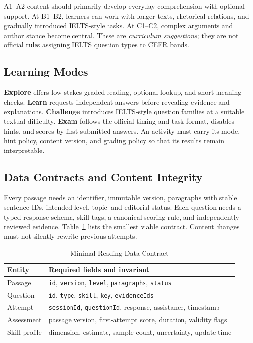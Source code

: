 \documentclass[conference,10pt]{IEEEtran}
\begin{document}
A1--A2 content should primarily develop everyday comprehension with optional support. At B1--B2, learners can work with longer texts, rhetorical relations, and gradually introduced IELTS-style tasks. At C1--C2, complex arguments and author stance become central. These are \emph{curriculum suggestions}; they are not official rules assigning IELTS question types to CEFR bands.

\subsection{Learning Modes}
\textbf{Explore} offers low-stakes graded reading, optional lookup, and short meaning checks. \textbf{Learn} requests independent answers before revealing evidence and explanations. \textbf{Challenge} introduces IELTS-style question families at a suitable textual difficulty. \textbf{Exam} follows the official timing and task format, disables hints, and scores by first submitted answers. An activity must carry its mode, hint policy, content version, and grading policy so that its results remain interpretable.

\subsection{Data Contracts and Content Integrity}
Every passage needs an identifier, immutable version, paragraphs with stable sentence IDs, intended level, topic, and editorial status. Each question needs a typed response schema, skill tags, a canonical scoring rule, and independently reviewed evidence. Table~\ref{tab:contract} lists the smallest viable contract. Content changes must not silently rewrite previous attempts.

\begin{table}[t]
\caption{Minimal Reading Data Contract}
\label{tab:contract}
\centering\footnotesize
\begin{tabularx}{\columnwidth}{@{}p{}X@{}}
\toprule
Entity & Required fields and invariant\\
\midrule
Passage & \texttt{id}, \texttt{version}, \texttt{level}, \texttt{paragraphs}, \texttt{status}\\
Question & \texttt{id}, \texttt{type}, \texttt{skill}, \texttt{key}, \texttt{evidenceIds}\\
Attempt & \texttt{sessionId}, \texttt{questionId}, response, assistance, timestamp\\
Assessment & passage version, first-attempt score, duration, validity flags\\
Skill profile & dimension, estimate, sample count, uncertainty, update time\\
\bottomrule
\end{tabularx}
\end{table}
\end{document}
